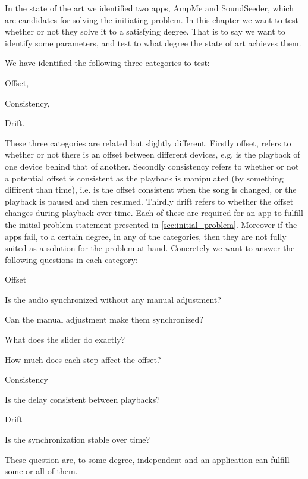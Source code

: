 In the state of the art we identified two apps, AmpMe and SoundSeeder, which are candidates for solving the initiating problem.
In this chapter we want to test whether or not they solve it to a satisfying degree.
That is to say we want to identify some parameters, and test to what degree the state of art achieves them.

We have identified the following three categories to test:
\begin{eletterate*}
    \item Offset,
    \item Consistency,
    \item Drift.
\end{eletterate*}

These three categories are related but slightly different.
Firstly offset, refers to whether or not there is an offset between different devices, e.g. is the playback of one device behind that of another.
Secondly consistency refers to whether or not a potential offset is consistent as the playback is manipulated (by something diffirent than time), i.e. is the offset consistent when the song is changed, or the playback is paused and then resumed.
Thirdly drift refers to whether the offset changes during playback over time.
Each of these are required for an app to fulfill the initial problem statement presented in \vref{sec:initial_problem}.
Moreover if the apps fail, to a certain degree, in any of the categories, then they are not fully suited as a solution for the problem at hand.
Concretely we want to answer the following questions in each category:
\begin{eletterate}
    \item Offset
    \begin{enumberate}
        \item Is the audio synchronized without any manual adjustment?
        \item Can the manual adjustment make them synchronized?
        \begin{enumberate}
            \item What does the slider do exactly?
            \item How much does each step affect the offset?
        \end{enumberate}
    \end{enumberate}
    \item Consistency
    \begin{enumberate}[start=3]
        \item Is the delay consistent between playbacks?
    \end{enumberate}
    \item Drift
    \begin{enumberate}[start=4]
        \item Is the synchronization stable over time?
    \end{enumberate}
\end{eletterate}

These question are, to some degree, independent and an application can fulfill some or all of them. 
